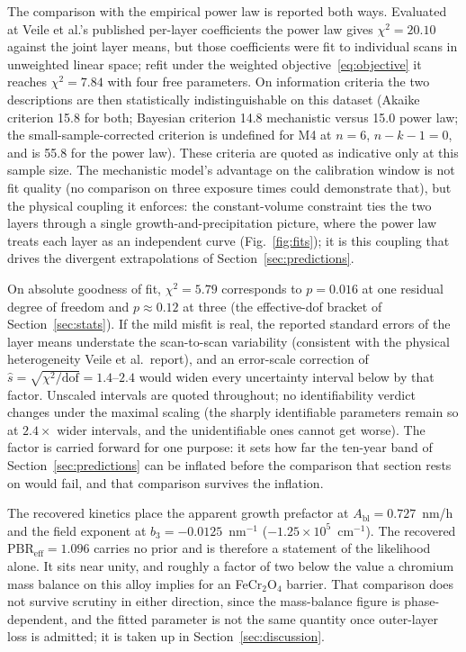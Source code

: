 \documentclass[pdflatex,sn-nature]{sn-jnl}
\begin{document}
The comparison with the empirical power law is reported both ways.
Evaluated at Veile et al.'s published per-layer coefficients the power
law gives $\chi^2 = 20.10$ against the joint layer means, but those
coefficients were fit to individual scans in unweighted linear space;
refit under the weighted objective~\eqref{eq:objective} it reaches
$\chi^2 = 7.84$ with four free parameters. On information criteria the
two descriptions are then statistically indistinguishable on this
dataset (Akaike criterion 15.8 for both; Bayesian criterion 14.8
mechanistic versus 15.0 power law; the small-sample-corrected criterion
is undefined for M4 at $n=6$, $n-k-1=0$, and is 55.8 for the power
law). These criteria are quoted as indicative only at this sample size.
The mechanistic model's advantage on the calibration window is not fit
quality (no comparison on three exposure times could demonstrate
that), but the physical coupling it enforces: the constant-volume
constraint ties the two layers through a single
growth-and-precipitation picture, where the power law treats each layer
as an independent curve (Fig.~\ref{fig:fits}); it is this coupling that
drives the divergent extrapolations of
Section~\ref{sec:predictions}.

On absolute goodness of fit, $\chi^2 = 5.79$ corresponds to $p = 0.016$
at one residual degree of freedom and $p \approx 0.12$ at three (the
effective-dof bracket of Section~\ref{sec:stats}). If the mild misfit
is real, the reported standard errors of the layer means understate the
scan-to-scan variability (consistent with the physical heterogeneity
Veile et al.\ report), and an error-scale correction of $\hat{s} = \sqrt{\chi^2/\text{dof}} = 1.4$--$2.4$ would widen every
uncertainty interval below by that factor. Unscaled intervals are
quoted throughout; no identifiability verdict changes under the maximal
scaling (the sharply identifiable parameters remain so at $2.4\times$
wider intervals, and the unidentifiable ones cannot get worse). The
factor is carried forward for one purpose: it sets how far the ten-year
band of Section~\ref{sec:predictions} can be inflated before the
comparison that section rests on would fail, and that comparison
survives the inflation.

The recovered kinetics place the apparent growth prefactor at
$A_\text{bl} = 0.727$~nm/h and the field exponent at
$b_3 = -0.0125$~nm$^{-1}$ ($-1.25\times10^{5}$~cm$^{-1}$). The
recovered $\mathrm{PBR}_\text{eff} = 1.096$ carries no prior and is
therefore a statement of the likelihood alone. It sits near unity, and
roughly a factor of two below the value a chromium mass balance on this
alloy implies for an FeCr$_2$O$_4$ barrier. That comparison does not
survive scrutiny in either direction, since the mass-balance figure is
phase-dependent, and the fitted parameter is not the same quantity once
outer-layer loss is admitted; it is taken up in
Section~\ref{sec:discussion}.
\end{document}
